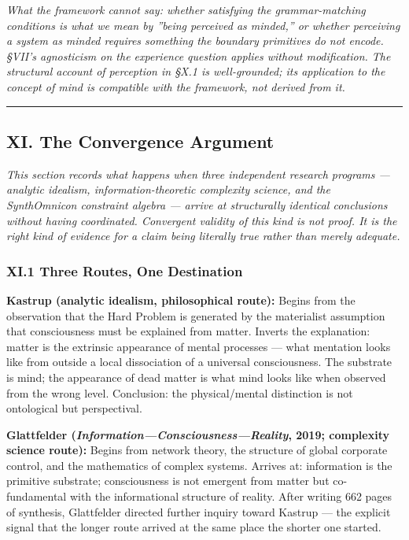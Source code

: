 \documentclass[12pt,a4paper]{article}
\begin{document}
\emph{What the framework cannot say: whether satisfying the grammar-matching conditions is what we mean by ''being perceived as minded,'' or whether perceiving a system as minded requires something the boundary primitives do not encode. §VII's agnosticism on the experience question applies without modification. The structural account of perception in §X.1 is well-grounded; its application to the concept of mind is compatible with the framework, not derived from it.}

\begin{center}
\rule{0.5\textwidth}{0.4pt}
\end{center}

\subsection{XI. The Convergence Argument}

\emph{This section records what happens when three independent research programs --- analytic idealism, information-theoretic complexity science, and the SynthOmnicon constraint algebra --- arrive at structurally identical conclusions without having coordinated. Convergent validity of this kind is not proof. It is the right kind of evidence for a claim being literally true rather than merely adequate.}

\subsubsection{XI.1 Three Routes, One Destination}

\textbf{Kastrup (analytic idealism, philosophical route):} Begins from the observation that the Hard Problem is generated by the materialist assumption that consciousness must be explained from matter. Inverts the explanation: matter is the extrinsic appearance of mental processes --- what mentation looks like from outside a local dissociation of a universal consciousness. The substrate is mind; the appearance of dead matter is what mind looks like when observed from the wrong level. Conclusion: the physical/mental distinction is not ontological but perspectival.

\textbf{Glattfelder (\emph{Information---Consciousness---Reality}, 2019; complexity science route):} Begins from network theory, the structure of global corporate control, and the mathematics of complex systems. Arrives at: information is the primitive substrate; consciousness is not emergent from matter but co-fundamental with the informational structure of reality. After writing 662 pages of synthesis, Glattfelder directed further inquiry toward Kastrup --- the explicit signal that the longer route arrived at the same place the shorter one started.
\end{document}
